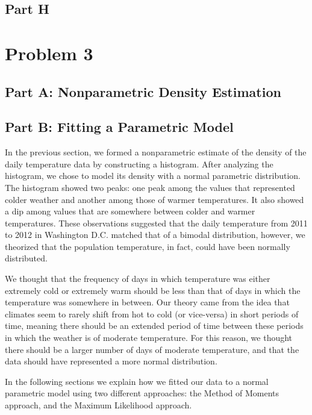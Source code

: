 \documentclass[11pt]{article}
\begin{document}
\subsection{Part H}
\label{subsec:2h}
\pagebreak

\section{Problem 3}
\label{sec:problem3}
\subsection{Part A: Nonparametric Density Estimation}
\label{subsec:3a}


\subsection{Part B: Fitting a Parametric Model}
\label{subsec:3b}
In the previous section, we formed a nonparametric estimate of the density of the daily temperature data by constructing a histogram. After analyzing the histogram, we chose to model its density with a normal parametric distribution. The histogram showed two peaks: one peak among the values that represented colder weather and another among those of warmer temperatures. It also showed a dip among values that are somewhere between colder and warmer temperatures. These observations suggested that the daily temperature from 2011 to 2012 in Washington D.C. matched that of a bimodal distribution, however, we theorized that the population temperature, in fact, could have been normally distributed.  

We thought that the frequency of days in which temperature was either extremely cold or extremely warm should be less than that of days in which the temperature was somewhere in between. Our theory came from the idea that climates seem to rarely shift from hot to cold (or vice-versa) in short periods of time, meaning there should be an extended period of time between these periods in which the weather is of moderate temperature. For this reason, we thought there should be a larger number of days of moderate temperature, and that the data should have represented a more normal distribution. 

In the following sections we explain how we fitted our data to a normal parametric model using two different approaches: the Method of Moments approach, and the Maximum Likelihood approach. 
\end{document}
